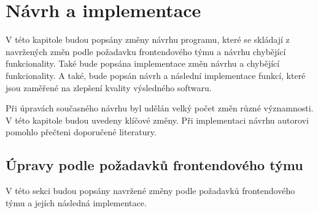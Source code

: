 \chapter{Návrh a implementace}\label{chapter:navrh}
V této kapitole budou popsány změny návrhu programu, které se skládají z navržených změn podle požadavku frontendového týmu a návrhu chybějící funkcionality. Také bude popsána implementace změn návrhu a chybějící funkcionality. A také, bude popsán návrh a následní implementace funkcí, které jsou zaměřené na zlepšení kvality výsledného softwaru.

Při úpravách současného návrhu byl udělán velký počet změn různé významnosti. V této kapitole budou uvedeny klíčové změny. Při implementaci návrhu autorovi pomohlo přečteni doporučené literatury.\cite{pro-spring-boot-2}

\section{Úpravy podle požadavků frontendového týmu}\label{navrh:upravy}
    V této sekci budou popsány navržené změny podle požadavků frontendového týmu a jejích následná implementace.
    
